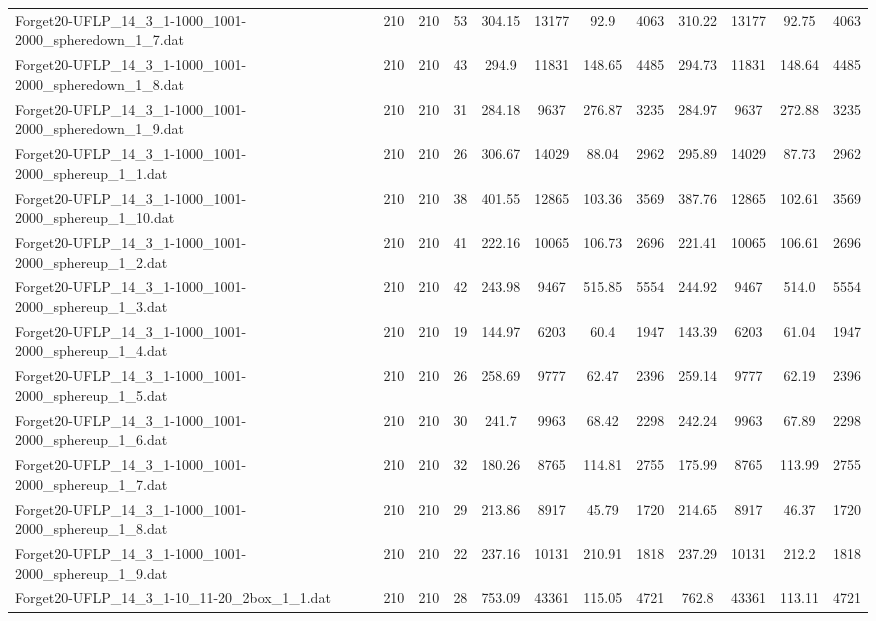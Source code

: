 \begin{sidewaystable}[!ht]
{\begin{tabular}{lccccccccccc}
Forget20-UFLP\_14\_3\_1-1000\_1001-2000\_spheredown\_1\_7.dat & 210 & 210 & 53 & 304.15 & 13177 & 92.9 & 4063 & 310.22 & 13177 & 92.75 & 4063 \\
Forget20-UFLP\_14\_3\_1-1000\_1001-2000\_spheredown\_1\_8.dat & 210 & 210 & 43 & 294.9 & 11831 & 148.65 & 4485 & 294.73 & 11831 &  \textcolor{blue2}{148.64} & 4485 \\
Forget20-UFLP\_14\_3\_1-1000\_1001-2000\_spheredown\_1\_9.dat & 210 & 210 & 31 & 284.18 & 9637 & 276.87 & 3235 & 284.97 & 9637 &  \textcolor{blue2}{272.88} & 3235 \\
Forget20-UFLP\_14\_3\_1-1000\_1001-2000\_sphereup\_1\_1.dat & 210 & 210 & 26 & 306.67 & 14029 & 88.04 & 2962 & 295.89 & 14029 & 87.73 & 2962 \\
Forget20-UFLP\_14\_3\_1-1000\_1001-2000\_sphereup\_1\_10.dat & 210 & 210 & 38 & 401.55 & 12865 & 103.36 & 3569 & 387.76 & 12865 & 102.61 & 3569 \\
Forget20-UFLP\_14\_3\_1-1000\_1001-2000\_sphereup\_1\_2.dat & 210 & 210 & 41 & 222.16 & 10065 & 106.73 & 2696 & 221.41 & 10065 & 106.61 & 2696 \\
Forget20-UFLP\_14\_3\_1-1000\_1001-2000\_sphereup\_1\_3.dat & 210 & 210 & 42 &  \textcolor{blue2}{243.98} & 9467 & 515.85 & 5554 & 244.92 & 9467 & 514.0 & 5554 \\
Forget20-UFLP\_14\_3\_1-1000\_1001-2000\_sphereup\_1\_4.dat & 210 & 210 & 19 & 144.97 & 6203 &  \textcolor{blue2}{60.4} & 1947 & 143.39 & 6203 & 61.04 & 1947 \\
Forget20-UFLP\_14\_3\_1-1000\_1001-2000\_sphereup\_1\_5.dat & 210 & 210 & 26 & 258.69 & 9777 & 62.47 & 2396 & 259.14 & 9777 & 62.19 & 2396 \\
Forget20-UFLP\_14\_3\_1-1000\_1001-2000\_sphereup\_1\_6.dat & 210 & 210 & 30 & 241.7 & 9963 & 68.42 & 2298 & 242.24 & 9963 & 67.89 & 2298 \\
Forget20-UFLP\_14\_3\_1-1000\_1001-2000\_sphereup\_1\_7.dat & 210 & 210 & 32 & 180.26 & 8765 & 114.81 & 2755 & 175.99 & 8765 & 113.99 & 2755 \\
Forget20-UFLP\_14\_3\_1-1000\_1001-2000\_sphereup\_1\_8.dat & 210 & 210 & 29 & 213.86 & 8917 & 45.79 & 1720 & 214.65 & 8917 & 46.37 & 1720 \\
Forget20-UFLP\_14\_3\_1-1000\_1001-2000\_sphereup\_1\_9.dat & 210 & 210 & 22 & 237.16 & 10131 & 210.91 & 1818 & 237.29 & 10131 & 212.2 & 1818 \\
Forget20-UFLP\_14\_3\_1-10\_11-20\_2box\_1\_1.dat & 210 & 210 & 28 & 753.09 & 43361 & 115.05 & 4721 & 762.8 & 43361 &  \textcolor{blue2}{113.11} & 4721 \\

\end{tabular}}
\end{sidewaystable}
